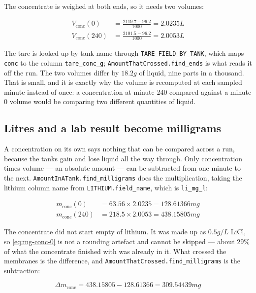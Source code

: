 The concentrate is weighed at both ends, so it needs two volumes:

\begin{align}
  V_{\mathrm{conc}}(0)   &= \frac{2119.7 - 96.2}{1000} = 2.0235\unit{L} \label{eq:v-conc-0} \\
  V_{\mathrm{conc}}(240) &= \frac{2101.5 - 96.2}{1000} = 2.0053\unit{L} \label{eq:v-conc-240}
\end{align}

The tare is looked up by tank name through \texttt{TARE\_FIELD\_BY\_TANK}, which maps
\texttt{conc} to the column \texttt{tare\_conc\_g}; \texttt{AmountThatCrossed.find\_ends} is
what reads it off the run. The two volumes differ by $18.2\unit{g}$ of liquid, nine parts in a
thousand. That is small, and it is exactly why the volume is recomputed at each sampled minute
instead of once: a concentration at minute 240 compared against a minute 0 volume would be
comparing two different quantities of liquid.

\subsection{Litres and a lab result become milligrams}

A concentration on its own says nothing that can be compared across a run, because the tanks
gain and lose liquid all the way through. Only concentration times volume --- an absolute
amount --- can be subtracted from one minute to the next.
\texttt{AmountInATank.find\_milligrams} does the multiplication, taking the lithium column
name from \texttt{LITHIUM.field\_name}, which is \texttt{li\_mg\_l}:

\begin{align}
  m_{\mathrm{conc}}(0)   &= 63.56 \times 2.0235 = 128.61366\unit{mg} \label{eq:mg-conc-0} \\
  m_{\mathrm{conc}}(240) &= 218.5 \times 2.0053 = 438.15805\unit{mg} \label{eq:mg-conc-240}
\end{align}

The concentrate did not start empty of lithium. It was made up as $0.5\unit{g/L}$ LiCl, so
\eqref{eq:mg-conc-0} is not a rounding artefact and cannot be skipped --- about $29\%$ of what
the concentrate finished with was already in it. What crossed the membranes is the difference,
and \texttt{AmountThatCrossed.\allowbreak find\_milligrams} is the subtraction:

\begin{equation}
  \Delta m_{\mathrm{conc}} = 438.15805 - 128.61366 = 309.54439\unit{mg}
  \label{eq:crossed}
\end{equation}


